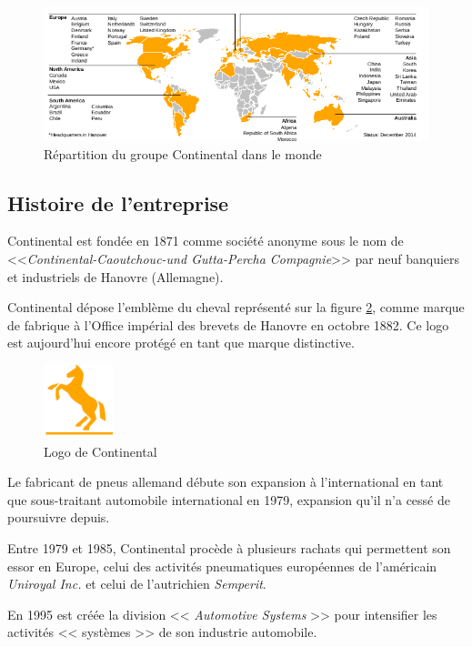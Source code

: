 \begin{figure}[H]
	\centering
	\includegraphics[width=16cm]{contents/images/repartitionConti.png}
	\caption{Répartition du groupe Continental dans le monde}
	\label{fig:repartitionConti}
\end{figure}		 

\subsection{Histoire de l'entreprise}
Continental est fondée en 1871 comme société anonyme sous le nom de <<\textit{Continental-Caoutchouc-und Gutta-Percha Compagnie}>> par neuf banquiers et industriels de Hanovre (Allemagne).

Continental dépose l'emblème du cheval représenté sur la figure \ref{fig:logo}, comme marque de fabrique à l'Office impérial des brevets de Hanovre en octobre 1882. Ce logo est aujourd'hui encore protégé en tant que marque distinctive.
\begin{figure}[H]
	\centering
	\includegraphics[width=2cm]{contents/images/logoConti.png}
	\caption{Logo de Continental}
	\label{fig:logo}
\end{figure}

Le fabricant de pneus allemand débute son expansion à l'international en tant que sous-traitant automobile international en 1979, expansion qu'il n'a cessé de poursuivre depuis.

Entre 1979 et 1985, Continental procède à plusieurs rachats qui permettent son essor en Europe, celui des activités pneumatiques européennes de l'américain \textit{Uniroyal Inc.} et celui de l'autrichien \textit{Semperit}.

En 1995 est créée la division << \textit{Automotive Systems} >> pour intensifier les activités << systèmes >> de son industrie automobile.


